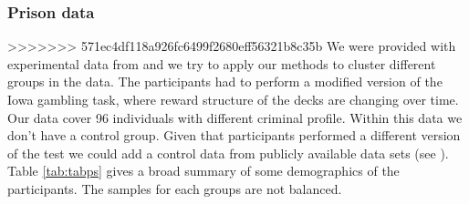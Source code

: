 \documentclass[12pt,a4paper,bibliography=totocnumbered,listof=totocnumbered]{scrartcl}
\begin{document}
\subsubsection{Prison data}

>>>>>>> 571ec4df118a926fc6499f2680eff56321b8c35b
We were provided with experimental data from \cite{Yechiam2008} and we try to apply our methods to cluster different groups in the data. The participants had to perform a modified version of the Iowa gambling task, where reward structure of the decks are changing over time.\\
Our data cover 96 individuals with different criminal profile. Within this data we don't have a control group. Given that participants performed a different version of the test we could add a control data from publicly available data sets (see \cite{Steingroever2015}).\\
Table \ref{tab:tabps} gives a broad summary of some demographics of the participants. The samples for each groups are not balanced. 

\begin{table}[H]
	\scriptsize
	 \centering 
	 		\caption{Summary prison data (means with standard deviation in parenthesis)} 
		\label{tab:tabps} 
\end{table} 
\end{document}
